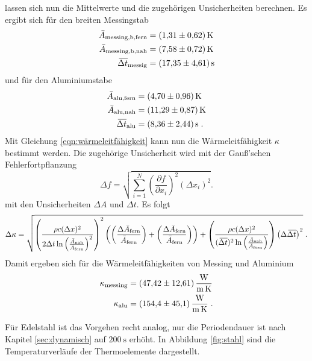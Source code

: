 lassen sich nun die Mittelwerte und die zugehörigen Unsicherheiten berechnen. Es ergibt sich für den breiten Messingstab
\begin{align*}
  \bar{A}_\text{messing,b,fern} &=\SI{1.31 \pm 0.62}{\kelvin}\\
  \bar{A}_\text{messing,b,nah}  &=\SI{7.58 \pm 0.72}{\kelvin}\\
  \olsi{\Delta t}_\text{messig} &=\SI{17.35\pm 4.61}{\second}\\
\end{align*}
und für den Aluminiumstabe
\begin{align*}
  \bar{A}_\text{alu,fern}       &=\SI{4.70 \pm 0.96}{\kelvin}\\
  \bar{A}_\text{alu,nah}        &=\SI{11.29\pm 0.87}{\kelvin}\\
  \olsi{\Delta t}_\text{alu}    &=\SI{8.36 \pm 2.44}{\second}\;.
\end{align*}
Mit Gleichung \eqref{eqn:wärmeleitfähigkeit} kann nun die Wärmeleitfähigkeit $\kappa$ bestimmt werden. Die zugehörige Unsicherheit wird mit der Gauß'schen
Fehlerfortpflanzung
\begin{equation}
  \Delta f = \sqrt{\sum_{i=1}^N
  \left(\frac{\partial f}{\partial x_i}\right)^2
  (\Delta x_i)^2}.
  \label{eqn:GaußFehler}
\end{equation}
mit den Unsicherheiten $\Delta A$ und $\Delta t$. Es folgt
\begin{equation*}
  \Delta\kappa=\sqrt{
    \left(  \frac{\rho c (\Delta x)^2}{2\Delta t \ln{\left(\frac{\bar{A}_\text{nah}}{\bar{A}_\text{fern}}\right)^2}} \right)^2
    \left(  \left(\frac{\Delta\bar{A}_\text{fern}}{\bar{A}_\text{fern}} \right)
    +\left( \frac{\Delta\bar{A}_\text{fern}}{\bar{A}_\text{fern}}  \right) \right)
    +\left( \frac{\rho c (\Delta x)^2}{(\olsi{\Delta t})^2\ln{\left(\frac{\bar{A}_\text{nah}}{\bar{A}_\text{fern}}\right)}}\right)
    \left(  \Delta\olsi{\Delta t}\right)^2
  }\;.
\end{equation*}
Damit ergeben sich für die Wärmeleitfähigkeiten von Messing und Aluminium
\begin{align*}
  \kappa_\text{messing}&=\SI{47.42\pm 12.61}{\watt\per\metre\per\kelvin}\\
  \kappa_\text{alu}    &=\SI{154.4\pm 45.1}{\watt\per\metre\per\kelvin}  \;.
\end{align*}

\noindent
Für Edelstahl ist das Vorgehen recht analog, nur die Periodendauer ist nach Kapitel \ref{sec:dynamisch} auf $\SI{200}{\second}$ erhöht.
In Abbildung \ref{fig:stahl} sind die Temperaturverläufe der Thermoelemente dargestellt.

